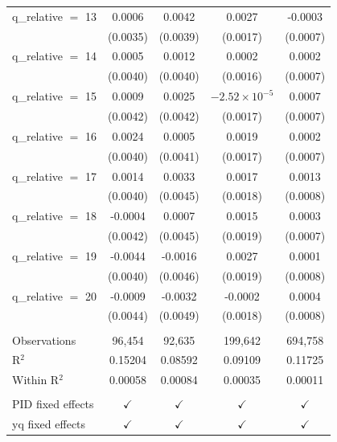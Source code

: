 \begin{tabular}{lcccc}
   q\_relative $=$ 13   & 0.0006               & 0.0042              & 0.0027                    & -0.0003\\   
                        & (0.0035)             & (0.0039)            & (0.0017)                  & (0.0007)\\   
   q\_relative $=$ 14   & 0.0005               & 0.0012              & 0.0002                    & 0.0002\\   
                        & (0.0040)             & (0.0040)            & (0.0016)                  & (0.0007)\\   
   q\_relative $=$ 15   & 0.0009               & 0.0025              & $-2.52\times 10^{-5}$     & 0.0007\\   
                        & (0.0042)             & (0.0042)            & (0.0017)                  & (0.0007)\\   
   q\_relative $=$ 16   & 0.0024               & 0.0005              & 0.0019                    & 0.0002\\   
                        & (0.0040)             & (0.0041)            & (0.0017)                  & (0.0007)\\   
   q\_relative $=$ 17   & 0.0014               & 0.0033              & 0.0017                    & 0.0013\\   
                        & (0.0040)             & (0.0045)            & (0.0018)                  & (0.0008)\\   
   q\_relative $=$ 18   & -0.0004              & 0.0007              & 0.0015                    & 0.0003\\   
                        & (0.0042)             & (0.0045)            & (0.0019)                  & (0.0007)\\   
   q\_relative $=$ 19   & -0.0044              & -0.0016             & 0.0027                    & 0.0001\\   
                        & (0.0040)             & (0.0046)            & (0.0019)                  & (0.0008)\\   
   q\_relative $=$ 20   & -0.0009              & -0.0032             & -0.0002                   & 0.0004\\   
                        & (0.0044)             & (0.0049)            & (0.0018)                  & (0.0008)\\   
    \\
   Observations         & 96,454               & 92,635              & 199,642                   & 694,758\\  
   R$^2$                & 0.15204              & 0.08592             & 0.09109                   & 0.11725\\  
   Within R$^2$         & 0.00058              & 0.00084             & 0.00035                   & 0.00011\\  
    \\
   PID fixed effects    & $\checkmark$         & $\checkmark$        & $\checkmark$              & $\checkmark$\\   
   yq fixed effects     & $\checkmark$         & $\checkmark$        & $\checkmark$              & $\checkmark$\\   
   \bottomrule
\end{tabular}
\par\endgroup



